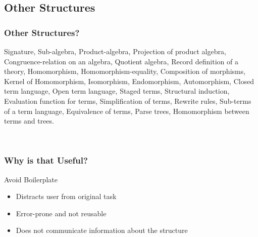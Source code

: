 \documentclass[t,12pt,numbers,fleqn,usenames,xcolor=dvipsnames]{beamer}
\begin{document}
\subsection{Other Structures}
\begin{frame}
\frametitle{Other Structures?}
\vspace{0.15cm}
{\scriptsize
	Signature, Sub-algebra, Product-algebra, Projection of product algebra, Congruence-relation on 
	an algebra, Quotient algebra, Record definition of a theory, Homomorphism, 
	Homomorphism-equality, Composition of morphisms, Kernel of Homomorphism, Isomorphism, 
	Endomorphism, Automorphism, Closed term language, Open term language, Staged terms, 
	Structural induction, Evaluation function for terms, Simplification of terms, Rewrite rules, 
	Sub-terms of a term language, Equivalence of terms, Parse trees, Homomorphism between 
	terms and trees. 
}

\vspace{0.3cm}
\pause
{}
\
\end{frame}

\begin{frame}
\frametitle{Why is that Useful?}
Avoid Boilerplate 
\begin{itemize}
	\item Distracts user from original task 
	\item Error-prone and not reusable 
	\item Does not communicate information about the structure 
\end{itemize}
\end{frame}

\end{document}
